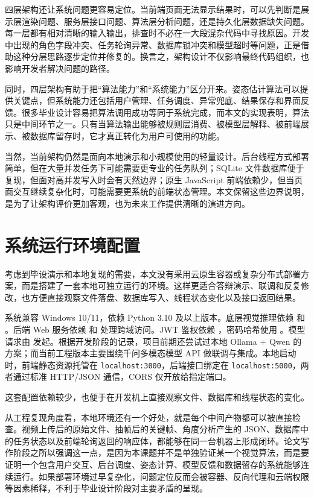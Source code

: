 \documentclass[UTF8,twoside]{ctexrep}
\makeatletter
\def@NAT@last@yr{\@citea}%
\def@NAT@last@yr{-\NAT@penalty}%
\makeatother
\begin{document}
四层架构还让系统问题更容易定位。当前端页面无法显示结果时，可以先判断是展示层渲染问题、服务层接口问题、算法层分析问题，还是持久化层数据缺失问题。每一层都有相对清晰的输入输出，排查时不必在一大段混杂代码中寻找原因。开发中出现的角色字段冲突、任务轮询异常、数据库锁冲突和模型超时等问题，正是借助这种分层思路逐步定位并修复的。换言之，架构设计不仅影响最终代码组织，也影响开发者解决问题的路径。

同时，四层架构有助于把“算法能力”和“系统能力”区分开来。姿态估计算法可以提供关键点，但系统能力还包括用户管理、任务调度、异常兜底、结果保存和界面反馈。很多毕业设计容易把算法调用成功等同于系统完成，而本文的实现表明，算法只是中间环节之一。只有当算法输出能够被规则层消费、被模型层解释、被前端展示、被数据库留存时，它才真正转化为用户可使用的功能。

当然，当前架构仍然是面向本地演示和小规模使用的轻量设计。后台线程方式部署简单，但在大量并发任务下可能需要更专业的任务队列；SQLite 文件数据库便于复现，但面对高并发写入时会有天然边界；原生 JavaScript 前端依赖少，但当页面交互继续复杂化时，可能需要更系统的前端状态管理。本文保留这些边界说明，是为了让架构评价更加客观，也为未来工作提供清晰的演进方向。

\section{系统运行环境配置}
考虑到毕设演示和本地复现的需要，本文没有采用云原生容器或复杂分布式部署方案，而是搭建了一套本地可独立运行的环境。这样更适合答辩演示、联调和反复修改，也方便直接观察文件落盘、数据库写入、线程状态变化以及接口返回结果。

系统兼容 Windows 10/11，依赖 Python 3.10 及以上版本。底层视觉推理依赖  和 。后端 Web 服务依赖  和  处理跨域访问。JWT 鉴权依赖 ，密码哈希使用 。模型请求由  发起。根据开发阶段的记录，项目前期还尝试过本地 Ollama + Qwen 的方案；而当前工程版本主要围绕千问多模态模型 API 做联调与集成。本地启动时，前端静态资源托管在 \texttt{localhost:3000}，后端接口绑定在 \texttt{localhost:5000}，两者通过标准 HTTP/JSON 通信，CORS 仅开放给指定端口。

这套配置依赖较少，也便于在开发机上直接观察文件、数据库和线程状态的变化。

从工程复现角度看，本地环境还有一个好处，就是每个中间产物都可以被直接检查。视频上传后的原始文件、抽帧后的关键帧、角度分析产生的 JSON、数据库中的任务状态以及前端轮询返回的响应体，都能够在同一台机器上形成闭环。论文写作阶段之所以强调这一点，是因为本课题并不是单独验证某一个视觉算法，而是要证明一个包含用户交互、后台调度、姿态计算、模型反馈和数据留存的系统能够连续运行。如果部署环境过早复杂化，问题定位反而会被容器、反向代理和云端权限等因素稀释，不利于毕业设计阶段对主要矛盾的呈现。
\end{document}
